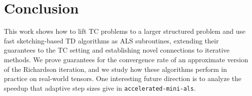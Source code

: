 \section{Conclusion}
\label{sec:conclusion}

This work shows how to lift TC problems to a larger structured problem
and use fast sketching-based TD algorithms as ALS subroutines,
extending their guarantees to the TC setting and establishing novel connections to iterative methods.
We prove guarantees for the convergence rate of an approximate version of the Richardson iteration,
and we study how these algorithms perform in practice on real-world tensors.
One interesting future direction is to analyze the speedup that adaptive step sizes give in \texttt{accelerated-mini-als}.
